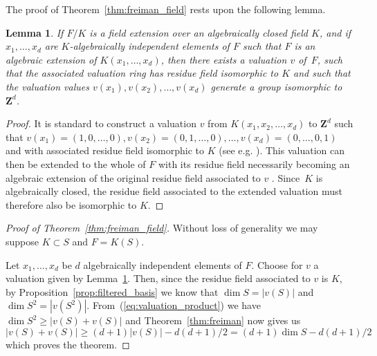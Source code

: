 \documentclass{article}
\theoremstyle{plain}
\newtheorem{lemma}[thm]{Lemma}
\theoremstyle{definition}
\theoremstyle{remark}
\newtheorem{rema}[thm]{Remark}
\def\Z{{\mathbf Z}}
\renewcommand{\geq}{\geqslant}
\begin{document}

The proof of Theorem~\ref{thm:freiman_field} rests upon the following lemma.

\begin{lemma}\label{lem:val}
  If $F/K$ is a field extension over an algebraically closed field
  $K$, and if $x_1,\ldots ,x_d$ are $K$-algebraically independent
  elements of $F$ such that $F$ is an algebraic extension of
  $K(x_1,\ldots,x_d)$, then there exists a valuation $v$ of~$F$, such
  that the associated valuation ring has residue field isomorphic to
  $K$ and such that the valuation values $v(x_1),v(x_2),\ldots,v(x_d)$
  generate a group isomorphic to~$\Z^d$.
\end{lemma}

\begin{proof}
  It is standard to construct a valuation $v$ from $K(x_1,x_2,\ldots
  ,x_d)$ to $\Z^d$ such that $v(x_1)=(1,0,\ldots,0),
  v(x_2)=(0,1,\ldots,0),\ldots, v(x_d)= (0,\ldots,0,1)$ and with
  associated residue field isomorphic to $K$ (see
  e.g. \cite[Ch. 6, \S 3.4, Example~6]{Bourbaki_AlgComm5-6}).
  This valuation can then be extended to the whole of $F$
  \cite[Ch. 6, \S 3,3, Proposition~5]{Bourbaki_AlgComm5-6} with its
  residue field necessarily becoming an algebraic extension of the original
  residue field associated to $v$
  \cite[Ch. 6, \S 8.1, Proposition 1]{Bourbaki_AlgComm5-6}. Since~$K$
  is algebraically closed, the
  residue field associated to the extended valuation must 
  therefore also be isomorphic to $K$.
\end{proof}


\begin{proof}[Proof of Theorem~\ref{thm:freiman_field}]
Without loss of
generality we may suppose $K\subset S$ and $F=K(S)$. 

Let $x_1,\ldots ,x_d$
be $d$ algebraically independent elements of $F$.
Choose for $v$ a valuation given by
Lemma~\ref{lem:val}.  Then, since the residue field associated to $v$
is $K$, by Proposition~\ref{prop:filtered_basis} we know that
$\dim S=|v(S)|$ and $\dim S^2=|v(S^2)|$.
From~(\ref{eq:valuation_product}) we have $\dim S^2 \geq |v(S)+v(S)|$
and Theorem~\ref{thm:freiman} now gives us
$$|v(S)+v(S)|\geq (d+1)|v(S)|-d(d+1)/2 = (d+1)\dim S-d(d+1)/2$$
which proves the theorem.
\end{proof}
\end{document}
